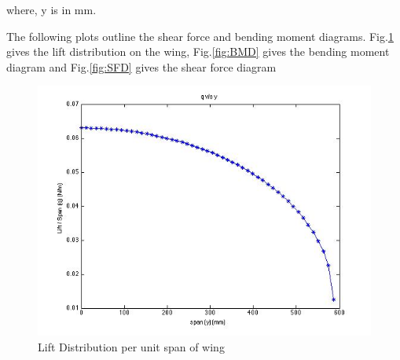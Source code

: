 where, y is in mm.

The following plots outline the shear force and bending moment diagrams. Fig.\ref{fig:liftdist} gives the lift distribution on the wing, Fig.\ref{fig:BMD} gives the bending moment diagram and Fig.\ref{fig:SFD} gives the shear force diagram
\begin{figure}[H]
    \begin{center}
      \includegraphics[width=5.1in]{figures/qy.jpg}
\caption{Lift Distribution per unit span of wing}
       \label{fig:liftdist}
    \end{center}
\end{figure}

